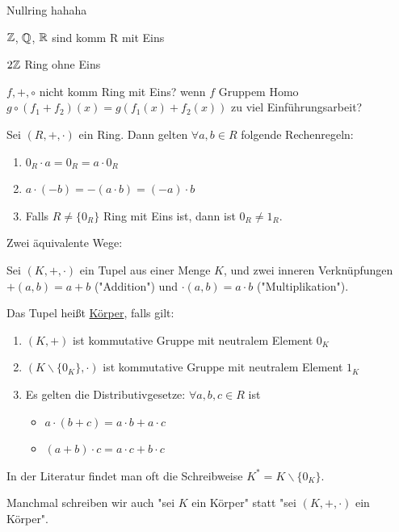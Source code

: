 \begin{example}
    Nullring hahaha
    
    $\mathbb{Z}$, $\mathbb{Q}$, $\mathbb{R}$ sind komm R mit Eins

    $2\mathbb{Z}$ Ring ohne Eins

    $f, +, \circ$ nicht komm Ring mit Eins? wenn $f$ Gruppem Homo
    $g \circ (f_1 + f_2)(x) = g(f_1(x) + f_2(x))$
    zu viel Einführungsarbeit?
\end{example}

\begin{lemma}[lemma]
    Sei $(R, +, \cdot)$ ein Ring. Dann gelten $\forall a, b \in R$ folgende Rechenregeln:
    \begin{enumerate}
        \item $0_R \cdot a = 0_R = a \cdot 0_R$
        \item $a \cdot (-b) = - (a \cdot b) = (-a) \cdot b$
        \item Falls $R \neq \{0_R\}$ Ring mit Eins ist, dann ist $0_R \neq 1_R$.
    \end{enumerate}
\end{lemma}

Zwei äquivalente Wege:

\begin{definition}[Körper]
    Sei $(K, +, \cdot)$ ein Tupel aus einer Menge $K$, und zwei inneren Verknüpfungen $+(a, b) = a + b$ ("Addition") und $\cdot(a, b) = a \cdot b$ ("Multiplikation").
    
    Das Tupel heißt \underline{Körper}, falls gilt:
    \begin{enumerate}[label=(K\arabic*)]
        \item $(K, +)$ ist kommutative Gruppe mit neutralem Element $0_K$
        \item $(K \backslash \{0_K\}, \cdot)$ ist kommutative Gruppe mit neutralem Element $1_K$
        \item Es gelten die Distributivgesetze: $\forall a, b, c \in R$ ist
        \begin{itemize}[label=]
            \item $a \cdot (b + c) = a \cdot b + a \cdot c$
            \item $(a + b) \cdot c = a \cdot c + b \cdot c$
        \end{itemize}
    \end{enumerate}
    In der Literatur findet man oft die Schreibweise $K^* = K \backslash \{0_K\}$.

    Manchmal schreiben wir auch "sei $K$ ein Körper" statt "sei $(K, +, \cdot)$ ein Körper".
\end{definition}

